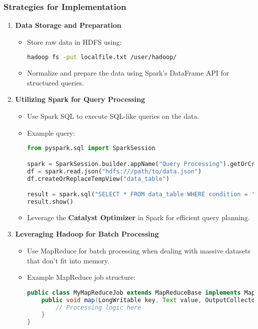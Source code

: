 \documentclass[aspectratio=169]{beamer}
\begin{document}
\begin{frame}[fragile]
    \frametitle{Strategies for Implementation}
    
    \begin{enumerate}
        \item \textbf{Data Storage and Preparation}
        \begin{itemize}
            \item Store raw data in HDFS using:
            \begin{lstlisting}[language=bash]
hadoop fs -put localfile.txt /user/hadoop/
            \end{lstlisting}
            \item Normalize and prepare the data using Spark’s DataFrame API for structured queries.
        \end{itemize}
        
        \item \textbf{Utilizing Spark for Query Processing}
        \begin{itemize}
            \item Use Spark SQL to execute SQL-like queries on the data.
            \item Example query:
            \begin{lstlisting}[language=python]
from pyspark.sql import SparkSession

spark = SparkSession.builder.appName("Query Processing").getOrCreate()
df = spark.read.json("hdfs:///path/to/data.json")
df.createOrReplaceTempView("data_table")

result = spark.sql("SELECT * FROM data_table WHERE condition = 'value'")
result.show()
            \end{lstlisting}
            \item Leverage the \textbf{Catalyst Optimizer} in Spark for efficient query planning.
        \end{itemize}
        
        \item \textbf{Leveraging Hadoop for Batch Processing}
        \begin{itemize}
            \item Use MapReduce for batch processing when dealing with massive datasets that don't fit into memory.
            \item Example MapReduce job structure:
            \begin{lstlisting}[language=java]
public class MyMapReduceJob extends MapReduceBase implements Mapper<LongWritable, Text, Text, IntWritable> {
    public void map(LongWritable key, Text value, OutputCollector<Text, IntWritable> output, Reporter reporter) {
        // Processing logic here
    }
}
            \end{lstlisting}
        \end{itemize}
    \end{enumerate}
\end{frame}
\end{document}
